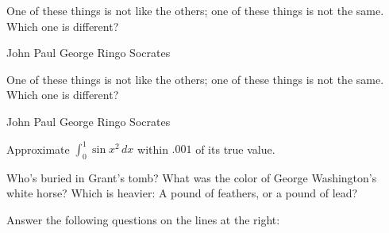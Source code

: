 \documentclass[a4paper,11pt]{exam}
\begin{document}
\begin{questions}



\question
One of these things is not like the others; one of these things is not
the same. Which one is different?
\begin{choices}
\choice John
\choice Paul
\choice George
\choice Ringo
\choice Socrates
\end{choices}



\question One of these things is not like the others; one of these
things is not the same. Which one is different?

\begin{oneparchoices}
\choice John
\choice Paul
\choice George
\choice Ringo
\CorrectChoice Socrates
\end{oneparchoices}




\question
Approximate $\displaystyle \int_0^1 \sin x^2 \, dx$ within $.001$ of
its true value.


\question
{}

\question
Who’s buried in Grant’s tomb?
\answerline
\question
What was the color of George Washington’s white horse?
\answerline
\question
Which is heavier: A pound of feathers, or a pound of lead?
\answerline

\question
Answer the following questions on the lines at the right:
\end{questions}
\end{document}
